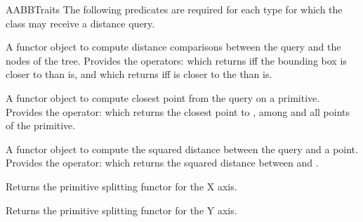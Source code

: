 \begin{ccRefConcept}{AABBTraits}
The following predicates are required for each type 
for which the class  may receive a distance query.

{} 
{A functor object to compute distance comparisons between the query and the nodes of the tree. Provides the operators:
 which returns  iff the bounding box is closer to  than  is, and  which returns  iff  is closer to the  than  is.}

{} 
{A functor object to compute closest point from the query on a primitive. Provides the operator:
 which returns the closest point to , among  and all points of the primitive.}

{A functor object to compute the squared distance between the query and a point. Provides the operator:
 which returns the squared distance between  and .}

{}  %


\ccOperations

{Returns the primitive splitting functor for the X axis.}

{Returns the primitive splitting functor for the Y axis.}


\end{ccRefConcept}
